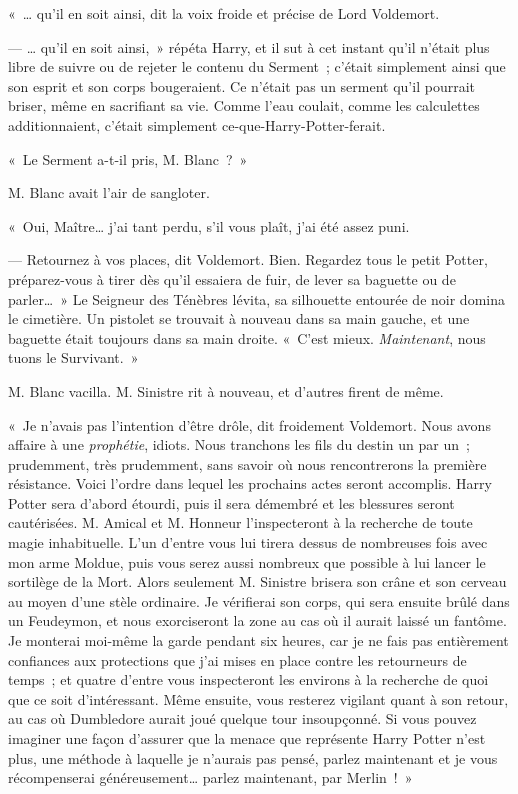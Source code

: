 «~… qu'il en soit ainsi, dit la voix froide et précise de Lord Voldemort.

--- … qu'il en soit ainsi,~» répéta Harry, et il sut à cet instant qu'il n'était plus libre de suivre ou de rejeter le contenu du Serment~; c'était simplement ainsi que son esprit et son corps bougeraient.
Ce n'était pas un serment qu'il pourrait briser, même en sacrifiant sa vie.
Comme l'eau coulait, comme les calculettes additionnaient, c'était simplement ce-que-Harry-Potter-ferait.

«~Le Serment a-t-il pris, M. Blanc~?~»

M. Blanc avait l'air de sangloter.

«~Oui, Maître… j'ai tant perdu, s'il vous plaît, j'ai été assez puni.

--- Retournez à vos places, dit Voldemort.
Bien. Regardez tous le petit Potter, préparez-vous à tirer dès qu'il essaiera de fuir, de lever sa baguette ou de parler…~»
Le Seigneur des Ténèbres lévita, sa silhouette entourée de noir domina le cimetière.
Un pistolet se trouvait à nouveau dans sa main gauche, et une baguette était toujours dans sa main droite.
«~C'est mieux.
\emph{Maintenant}, nous tuons le Survivant.~»

M. Blanc vacilla.
M. Sinistre rit à nouveau, et d'autres firent de même.

«~Je n'avais pas l'intention d'être drôle, dit froidement Voldemort.
Nous avons affaire à une \emph{prophétie}, idiots.
Nous tranchons les fils du destin un par un~; prudemment, très prudemment, sans savoir où nous rencontrerons la première résistance.
Voici l'ordre dans lequel les prochains actes seront accomplis.
Harry Potter sera d'abord étourdi, puis il sera démembré et les blessures seront cautérisées.
M. Amical et M. Honneur l'inspecteront à la recherche de toute magie inhabituelle.
L'un d'entre vous lui tirera dessus de nombreuses fois avec mon arme Moldue, puis vous serez aussi nombreux que possible à lui lancer le sortilège de la Mort.
Alors seulement M. Sinistre brisera son crâne et son cerveau au moyen d'une stèle ordinaire.
Je vérifierai son corps, qui sera ensuite brûlé dans un Feudeymon, et nous exorciseront la zone au cas où il aurait laissé un fantôme.
Je monterai moi-même la garde pendant six heures, car je ne fais pas entièrement confiances aux protections que j'ai mises en place contre les retourneurs de temps~; et quatre d'entre vous inspecteront les environs à la recherche de quoi que ce soit d'intéressant.
Même ensuite, vous resterez vigilant quant à son retour, au cas où Dumbledore aurait joué quelque tour insoupçonné.
Si vous pouvez imaginer une façon d'assurer que la menace que représente Harry Potter n'est plus, une méthode à laquelle je n'aurais pas pensé, parlez maintenant et je vous récompenserai généreusement… parlez maintenant, par Merlin~!~»

